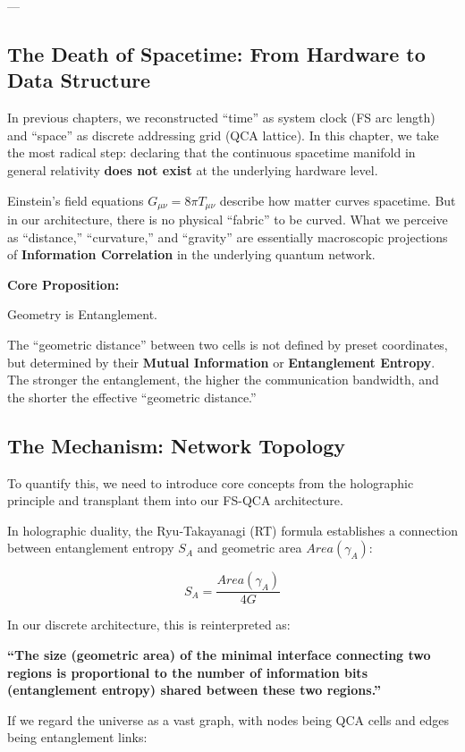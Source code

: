 \documentclass[11pt,a4paper,twoside]{book}
\begin{document}
---

\subsection{The Death of Spacetime: From Hardware to Data Structure}

In previous chapters, we reconstructed ``time'' as system clock (FS arc length) and ``space'' as discrete addressing grid (QCA lattice). In this chapter, we take the most radical step: declaring that the continuous spacetime manifold in general relativity \textbf{does not exist} at the underlying hardware level.

Einstein's field equations $G_{\mu\nu} = 8\pi T_{\mu\nu}$ describe how matter curves spacetime. But in our architecture, there is no physical ``fabric'' to be curved. What we perceive as ``distance,'' ``curvature,'' and ``gravity'' are essentially macroscopic projections of \textbf{Information Correlation} in the underlying quantum network.

\textbf{Core Proposition:}

Geometry is Entanglement.

The ``geometric distance'' between two cells is not defined by preset coordinates, but determined by their \textbf{Mutual Information} or \textbf{Entanglement Entropy}. The stronger the entanglement, the higher the communication bandwidth, and the shorter the effective ``geometric distance.''

\subsection{The Mechanism: Network Topology}

To quantify this, we need to introduce core concepts from the holographic principle and transplant them into our FS-QCA architecture.

In holographic duality, the Ryu-Takayanagi (RT) formula establishes a connection between entanglement entropy $S_A$ and geometric area $Area(\gamma_A)$:

$$S_A = \frac{Area(\gamma_A)}{4G}$$

In our discrete architecture, this is reinterpreted as:

\textbf{``The size (geometric area) of the minimal interface connecting two regions is proportional to the number of information bits (entanglement entropy) shared between these two regions.''}

If we regard the universe as a vast graph, with nodes being QCA cells and edges being entanglement links:
\end{document}
